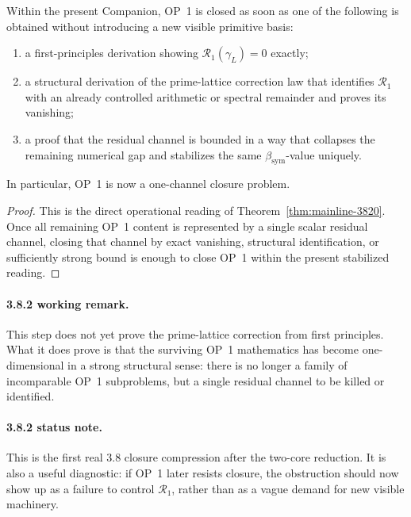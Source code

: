 \begin{corollary}
\label{cor:mainline-3820}
Within the present Companion, OP~1 is closed as soon as one of the following is obtained without introducing a new visible primitive basis:
\begin{enumerate}[label=(\alph*), leftmargin=2em]
  \item a first-principles derivation showing \(\mathcal R_{1}(\gamma_L)=0\) exactly;
  \item a structural derivation of the prime-lattice correction law that identifies \(\mathcal R_{1}\) with an already controlled arithmetic or spectral remainder and proves its vanishing;
  \item a proof that the residual channel is bounded in a way that collapses the remaining numerical gap and stabilizes the same \(\beta_{\mathrm{sym}}\)-value uniquely.
\end{enumerate}
In particular, OP~1 is now a one-channel closure problem.
\end{corollary}

\begin{proof}
This is the direct operational reading of Theorem~\ref{thm:mainline-3820}. Once all remaining OP~1 content is represented by a single scalar residual channel, closing that channel by exact vanishing, structural identification, or sufficiently strong bound is enough to close OP~1 within the present stabilized reading.
\end{proof}

\paragraph{3.8.2 working remark.}
This step does not yet prove the prime-lattice correction from first principles. What it does prove is that the surviving OP~1 mathematics has become one-dimensional in a strong structural sense: there is no longer a family of incomparable OP~1 subproblems, but a single residual channel to be killed or identified.

\paragraph{3.8.2 status note.}
This is the first real 3.8 closure compression after the two-core reduction. It is also a useful diagnostic: if OP~1 later resists closure, the obstruction should now show up as a failure to control \(\mathcal R_{1}\), rather than as a vague demand for new visible machinery.

